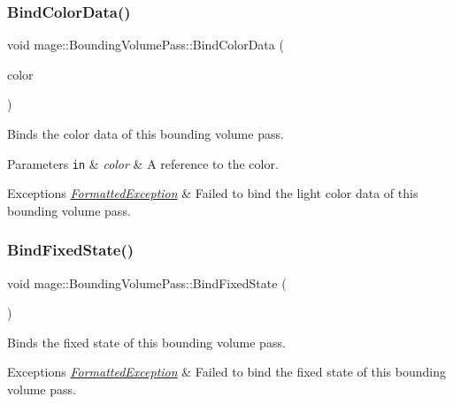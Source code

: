 \subsubsection{\texorpdfstring{Bind\+Color\+Data()}{BindColorData()}}
{\footnotesize\ttfamily void mage\+::\+Bounding\+Volume\+Pass\+::\+Bind\+Color\+Data (\begin{DoxyParamCaption}\item[{const \hyperlink{structmage_1_1_r_g_b_a}{R\+G\+BA} \&}]{color }\end{DoxyParamCaption})\hspace{0.3cm}{\ttfamily [private]}}

Binds the color data of this bounding volume pass.


\begin{DoxyParams}[1]{Parameters}
\mbox{\tt in}  & {\em color} & A reference to the color. \\
\hline
\end{DoxyParams}

\begin{DoxyExceptions}{Exceptions}
{\em \hyperlink{classmage_1_1_formatted_exception}{Formatted\+Exception}} & Failed to bind the light color data of this bounding volume pass. \\
\hline
\end{DoxyExceptions}
\hypertarget{classmage_1_1_bounding_volume_pass_a67c802211155c0eae3e15343244ba2c4}{}\label{classmage_1_1_bounding_volume_pass_a67c802211155c0eae3e15343244ba2c4} 
\subsubsection{\texorpdfstring{Bind\+Fixed\+State()}{BindFixedState()}}
{\footnotesize\ttfamily void mage\+::\+Bounding\+Volume\+Pass\+::\+Bind\+Fixed\+State (\begin{DoxyParamCaption}{ }\end{DoxyParamCaption})}

Binds the fixed state of this bounding volume pass.


\begin{DoxyExceptions}{Exceptions}
{\em \hyperlink{classmage_1_1_formatted_exception}{Formatted\+Exception}} & Failed to bind the fixed state of this bounding volume pass. \\
\hline
\end{DoxyExceptions}
\hypertarget{classmage_1_1_bounding_volume_pass_a9dcca637d98ea8335777094d3d994f5c}{}\label{classmage_1_1_bounding_volume_pass_a9dcca637d98ea8335777094d3d994f5c} 
